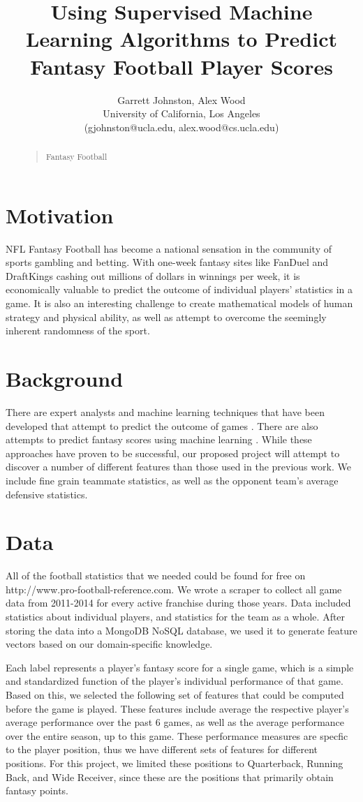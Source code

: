 \documentclass[11pt,a4paper]{article}
\title{Using Supervised Machine Learning Algorithms to Predict Fantasy Football Player Scores}
\author{Garrett Johnston, Alex Wood \\
University of California, Los Angeles \\
(gjohnston@ucla.edu, alex.wood@cs.ucla.edu) \\
}
\begin{document}
\maketitle

\begin{abstract}
\begin{quote}
  Fantasy Football
\end{quote}
\end{abstract}

\section{Motivation}
NFL Fantasy Football has become a national sensation in the community of sports gambling and betting.  With one-week fantasy sites like FanDuel and DraftKings cashing out millions of dollars in winnings per week, it is economically valuable to predict the outcome of individual players' statistics in a game. It is also an interesting challenge to create mathematical models of human strategy and physical ability, as well as attempt to overcome the seemingly inherent randomness of the sport.

\section{Background}
There are expert analysts and machine learning techniques that have been developed that attempt to predict the outcome of games \cite{Cornell}. There are also attempts to predict fantasy scores using machine learning \cite{UMASS}. While these approaches have proven to be successful, our proposed project will attempt to discover a number of different features than those used in the previous work. We include fine grain teammate statistics, as well as the opponent team's average defensive statistics.

\section{Data}
All of the football statistics that we needed could be found for free on http://www.pro-football-reference.com. We wrote a scraper to collect all game data from 2011-2014 for every active franchise during those years. Data included statistics about individual players, and statistics for the team as a whole. After storing the data into a MongoDB NoSQL database, we used it to generate feature vectors based on our domain-specific knowledge. 

Each label represents a player's fantasy score for a single game, which is a simple and standardized function of the player's individual performance of that game. Based on this, we selected the following set of features that could be computed before the game is played. These features include average the respective player's average performance over the past 6 games, as well as the average performance over the entire season, up to this game. These performance measures are specfic to the player position, thus we have different sets of features for different positions. For this project, we limited these positions to Quarterback, Running Back, and Wide Receiver, since these are the positions that primarily obtain fantasy points.
\end{document}
